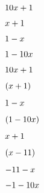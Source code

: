 \documentclass[10pt,a4paper]{article}
\begin{document}
	$\binomio{10}{1}$
	
	$\binomio{1}{1}$
	
	$\binomio{-1}{1}$
	
	$\binomio{-10}{1}$
	
	$\binomio{10}{1}$
	
	$\binomiop{1}{1}$
	
	$\binomio{-1}{1}$
	
	$\binomiop{-10}{1}$
	
	$\binomio{1}{1}$
	
	$\binomiop{1}{-11}$
	
	$\binomio{-1}{-11}$
	
	$\binomio{-10}{-1}$
	
\end{document}
